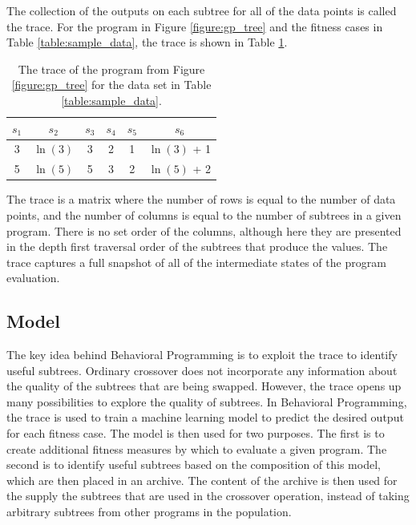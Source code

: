 The collection of the outputs on each subtree for all of the data points is called the trace.  For the program in Figure \ref{figure:gp_tree} and the fitness cases in Table \ref{table:sample_data}, the trace is shown in Table \ref{table:sample_trace}.

\begin{table}[ht]
\centering
\begin{tabular}{ c c c c c c }
\hline\hline
$s_{1}$ & $s_{2}$ & $s_{3}$ & $s_{4}$ & $s_{5}$ & $s_{6}$ \\ [0.5ex]
\hline
3 & $\ln(3)$ & 3 & 2 & 1 & $\ln(3)$ + 1 \\
5 & $\ln(5)$ & 5 & 3 & 2 & $\ln(5)$ + 2 \\[1ex]
\hline
\end{tabular}
\caption{The trace of the program from Figure \ref{figure:gp_tree} for the data set in Table \ref{table:sample_data}.}
\label{table:sample_trace}
\end{table}

The trace is a matrix where the number of rows is equal to the number of data points, and the number of columns is equal to the number of subtrees in a given program.  There is no set order of the columns, although here they are presented in the depth first traversal order of the subtrees that produce the values.  The trace captures a full snapshot of all of the intermediate states of the program evaluation.

\subsection{Model}
The key idea behind Behavioral Programming is to exploit the trace to identify useful subtrees.  Ordinary crossover does not incorporate any information about the quality of the subtrees that are being swapped.  However, the trace opens up many possibilities to explore the quality of subtrees.  In Behavioral Programming, the trace is used to train a machine learning model to predict the desired output for each fitness case.  The model is then used for two purposes.  The first is to create additional fitness measures by which to evaluate a given program.  The second is to identify useful subtrees based on the composition of this model, which are then placed in an archive.  The content of the archive is then used for the supply the subtrees that are used in the crossover operation, instead of taking arbitrary subtrees from other programs in the population.


